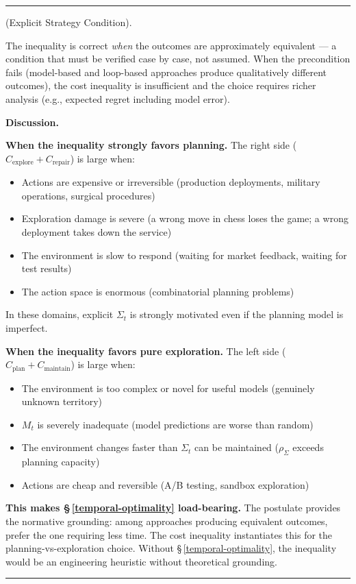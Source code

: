 \documentclass[11pt,oneside]{article}
\newcounter{claim}[section]
\renewcommand{\theclaim}{\thesection.\arabic{claim}}
\newenvironment{segment}[2]{%
  \refstepcounter{claim}%
  \bigskip\noindent\hrule\smallskip
  \noindent{\bfseries #1~\theclaim}\enskip(#2).\par\smallskip
  \noindent\ignorespaces
}{%
  \par\smallskip\noindent\hrule\bigskip
}
\newenvironment{normative}[1][]{\begin{segment}{Normative}{#1}}{\end{segment}}
\begin{document}
\begin{normative}[Explicit Strategy Condition]
The inequality is correct \textit{when} the outcomes are approximately equivalent — a condition that must be verified case by case, not assumed. When the precondition fails (model-based and loop-based approaches produce qualitatively different outcomes), the cost inequality is insufficient and the choice requires richer analysis (e.g., expected regret including model error).


\medskip\noindent\textbf{Discussion.}


\textbf{When the inequality strongly favors planning.} The right side ($C_{\text{explore}} + C_{\text{repair}}$) is large when:
\begin{itemize}
  \item Actions are expensive or irreversible (production deployments, military operations, surgical procedures)
  \item Exploration damage is severe (a wrong move in chess loses the game; a wrong deployment takes down the service)
  \item The environment is slow to respond (waiting for market feedback, waiting for test results)
  \item The action space is enormous (combinatorial planning problems)
\end{itemize}


In these domains, explicit $\Sigma_t$ is strongly motivated even if the planning model is imperfect.

\textbf{When the inequality favors pure exploration.} The left side ($C_{\text{plan}} + C_{\text{maintain}}$) is large when:
\begin{itemize}
  \item The environment is too complex or novel for useful models (genuinely unknown territory)
  \item $M_t$ is severely inadequate (model predictions are worse than random)
  \item The environment changes faster than $\Sigma_t$ can be maintained ($\rho_\Sigma$ exceeds planning capacity)
  \item Actions are cheap and reversible (A/B testing, sandbox exploration)
\end{itemize}


\textbf{This makes \S\,\ref{temporal-optimality} load-bearing.} The postulate provides the normative grounding: among approaches producing equivalent outcomes, prefer the one requiring less time. The cost inequality instantiates this for the planning-vs-exploration choice. Without \S\,\ref{temporal-optimality}, the inequality would be an engineering heuristic without theoretical grounding.


\end{normative}
\end{document}
